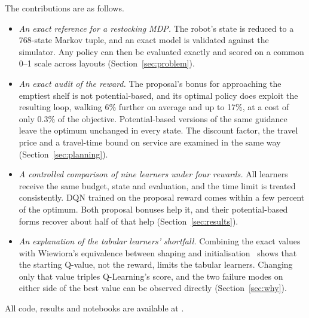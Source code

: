 The contributions are as follows.
\begin{itemize}
\item \emph{An exact reference for a restocking MDP.} The robot's state is reduced to a 768-state Markov tuple, and an exact model is validated against the simulator. Any policy can then be evaluated exactly and scored on a common 0--1 scale across layouts (Section~\ref{sec:problem}).
\item \emph{An exact audit of the reward.} The proposal's bonus for approaching the emptiest shelf is not potential-based, and its optimal policy does exploit the resulting loop, walking 6\% further on average and up to 17\%, at a cost of only 0.3\% of the objective. Potential-based versions of the same guidance leave the optimum unchanged in every state. The discount factor, the travel price and a travel-time bound on service are examined in the same way (Section~\ref{sec:planning}).
\item \emph{A controlled comparison of nine learners under four rewards.} All learners receive the same budget, state and evaluation, and the time limit is treated consistently. DQN trained on the proposal reward comes within a few percent of the optimum. Both proposal bonuses help it, and their potential-based forms recover about half of that help (Section~\ref{sec:results}).
\item \emph{An explanation of the tabular learners' shortfall.} Combining the exact values with Wiewiora's equivalence between shaping and initialisation~\cite{wiewiora2003} shows that the starting Q-value, not the reward, limits the tabular learners. Changing only that value triples Q-Learning's score, and the two failure modes on either side of the best value can be observed directly (Section~\ref{sec:why}).
\end{itemize}

All code, results and notebooks are available at \repo.
